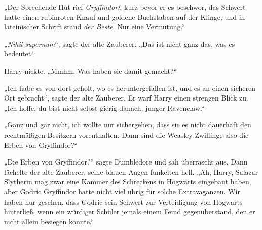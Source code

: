 „Der Sprechende Hut rief \emph{Gryffindor!}, kurz bevor er es beschwor, das Schwert hatte einen rubinroten Knauf und goldene Buchstaben auf der Klinge, und in lateinischer Schrift stand \emph{der Beste}. Nur eine Vermutung.“

„\emph{Nihil supernum}“, sagte der alte Zauberer.
„Das ist nicht ganz das, was es bedeutet.“

Harry nickte.
„Mmhm. Was haben sie damit gemacht?“

„Ich habe es von dort geholt, wo es heruntergefallen ist, und es an einen sicheren Ort gebracht“, sagte der alte Zauberer. Er warf Harry einen strengen Blick zu.
„Ich hoffe, du bist nicht selbst gierig danach, junger Ravenclaw.“

„Ganz und gar nicht, ich wollte nur sichergehen, dass sie es nicht dauerhaft den rechtmäßigen Besitzern vorenthalten. Dann sind die Weasley-Zwillinge also die Erben von Gryffindor?“

„Die Erben von Gryffindor?“ sagte Dumbledore und sah überrascht aus. Dann lächelte der alte Zauberer, seine blauen Augen funkelten hell.
„Ah, Harry, Salazar Slytherin mag zwar eine Kammer des Schreckens in Hogwarts eingebaut haben, aber Godric Gryffindor hatte nicht viel übrig für solche Extravaganzen. Wir haben nur gesehen, dass Godric sein Schwert zur Verteidigung von Hogwarts hinterließ, wenn ein würdiger Schüler jemals einem Feind gegenüberstand, den er nicht allein besiegen konnte.“

